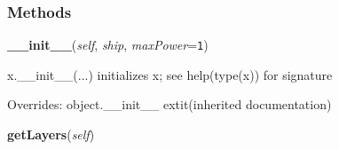 
  \subsubsection{Methods}

    \vspace{0.5ex}

\hspace{.8\funcindent}\begin{boxedminipage}{\funcwidth}

    \raggedright \textbf{\_\_init\_\_}(\textit{self}, \textit{ship}, \textit{maxPower}={\tt 1})

\setlength{\parskip}{2ex}
    x.\_\_init\_\_(...) initializes x; see help(type(x)) for signature

\setlength{\parskip}{1ex}
      Overrides: object.\_\_init\_\_ 	extit{(inherited documentation)}

    \end{boxedminipage}

    \label{systems:Shields:getLayers}

    \vspace{0.5ex}

\hspace{.8\funcindent}\begin{boxedminipage}{\funcwidth}

    \raggedright \textbf{getLayers}(\textit{self})

\setlength{\parskip}{2ex}
\setlength{\parskip}{1ex}
    \end{boxedminipage}

    \label{systems:Shields:incomingDamages}

    \vspace{0.5ex}

